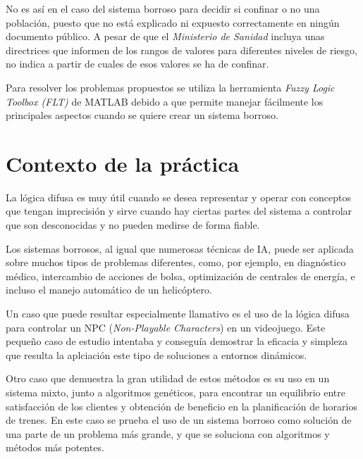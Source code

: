 \documentclass[12pt,a4paper, xcolor=table]{article}
\begin{document}
\vspace{2mm}

No es así en el caso del sistema borroso para decidir si confinar o no una población, puesto que no está explicado ni expuesto correctamente en ningún documento público. A pesar de que el \textit{Ministerio de Sanidad}\cite{poblacion} incluya unas directrices que informen de los rangos de valores para diferentes niveles de riesgo, no indica a partir de cuales de esos valores se ha de confinar.

\vspace{4mm}

Para resolver los problemas propuestos se utiliza la herramienta \textit{Fuzzy Logic Toolbox (FLT)} de MATLAB debido a que permite manejar fácilmente los principales aspectos cuando se quiere crear un sistema borroso.

\newpage

\section{Contexto de la práctica}

La lógica difusa es muy útil cuando se desea representar y operar con conceptos que tengan imprecisión y sirve cuando hay ciertas partes del sistema a controlar que son desconocidas y no pueden medirse de forma fiable.

\vspace{3mm}

Los sistemas borrosos, al igual que numerosas técnicas de IA, puede ser aplicada sobre muchos tipos de problemas diferentes, como, por ejemplo, en diagnóstico médico, intercambio de acciones de bolsa, optimización de centrales de energía, e incluso el manejo automático de un helicóptero\cite{fuzzy}.

\vspace{2mm}

Un caso que puede resultar especialmente llamativo es el uso de la lógica difusa para controlar un NPC (\textit{Non-Playable Characters}) en un videojuego\cite{fuzzygame}. Este pequeño caso de estudio intentaba y conseguía demostrar la eficacia y simpleza que resulta la aplciación este tipo de soluciones a entornos dinámicos.

\vspace{2mm}

Otro caso que demuestra la gran utilidad de estos métodos es su uso en un sistema mixto, junto a algoritmos genéticos, para encontrar un equilibrio entre satisfacción de los clientes y obtención de beneficio en la planificación de horarios de trenes\cite{fuzzytrain}. En este caso se prueba el uso de un sistema borroso como solución de una parte de un problema más grande, y que se soluciona con algoritmos y métodos más potentes.
\end{document}
